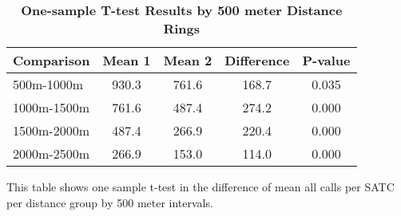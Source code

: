 \begin{table}[htbp]
\centering
\begin{tabular}{l|c c c c}
\hline
Comparison & Mean 1 & Mean 2 & Difference & P-value \\
\hline
500m-1000m & 930.3 & 761.6 & 168.7 & 0.035 \\
1000m-1500m & 761.6 & 487.4 & 274.2 & 0.000 \\
1500m-2000m & 487.4 & 266.9 & 220.4 & 0.000 \\
2000m-2500m & 266.9 & 153.0 & 114.0 & 0.000 \\
\hline
\end{tabular}
\caption{\textbf{One-sample T-test Results by 500 meter Distance Rings}}
\label{tab:ttests_500}
\centering\footnotesize{This table shows one sample t-test in the difference of mean all calls per SATC per distance group by 500 meter intervals.}
\end{table}
